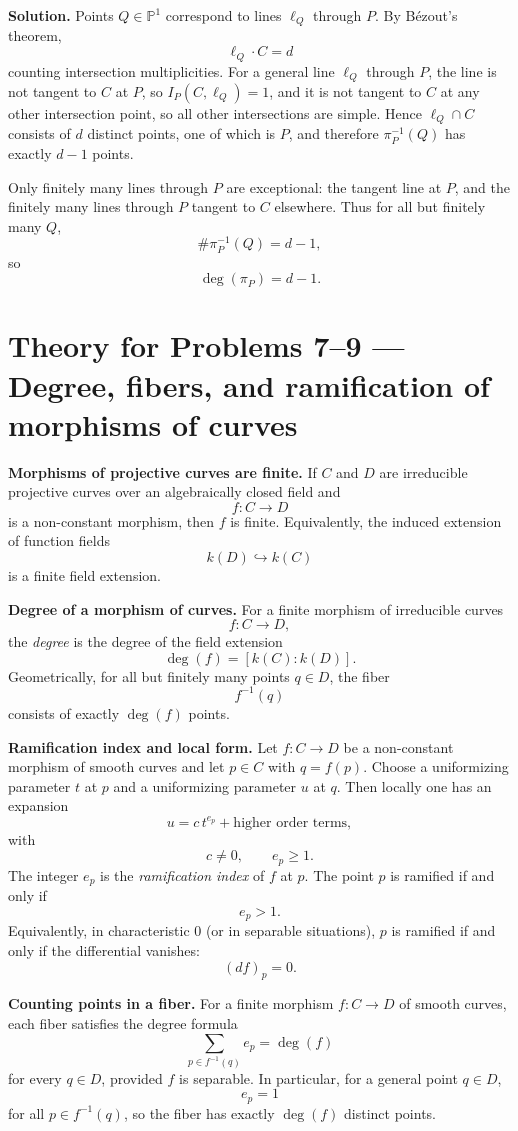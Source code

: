 \documentclass[12pt,a4paper]{article}
\theoremstyle{plain}
\theoremstyle{definition}      %
\begin{document}
\textbf{Solution.}
Points \(Q\in\mathbb P^1\) correspond to lines \(\ell_Q\) through \(P\).
By Bézout's theorem,
\[
\ell_Q\cdot C=d
\]
counting intersection multiplicities.
For a general line \(\ell_Q\) through \(P\), the line is not tangent to \(C\) at \(P\), so \(I_P(C,\ell_Q)=1\), and it is not tangent to \(C\) at any other intersection point, so all other intersections are simple.
Hence \(\ell_Q\cap C\) consists of \(d\) distinct points, one of which is \(P\), and therefore \(\pi_P^{-1}(Q)\) has exactly \(d-1\) points.

Only finitely many lines through \(P\) are exceptional: the tangent line at \(P\), and the finitely many lines through \(P\) tangent to \(C\) elsewhere.
Thus for all but finitely many \(Q\),
\[
\#\pi_P^{-1}(Q)=d-1,
\]
so
\[
\deg(\pi_P)=d-1.
\]


\section*{Theory for Problems 7--9 — Degree, fibers, and ramification of morphisms of curves}

\textbf{Morphisms of projective curves are finite.}
If \(C\) and \(D\) are irreducible projective curves over an algebraically closed field and
\[
f:C\to D
\]
is a non-constant morphism, then \(f\) is finite.
Equivalently, the induced extension of function fields
\[
k(D)\hookrightarrow k(C)
\]
is a finite field extension.

\textbf{Degree of a morphism of curves.}
For a finite morphism of irreducible curves
\[
f:C\to D,
\]
the \emph{degree} is the degree of the field extension
\[
\deg(f)=[k(C):k(D)].
\]
Geometrically, for all but finitely many points \(q\in D\), the fiber
\[
f^{-1}(q)
\]
consists of exactly \(\deg(f)\) points.

\textbf{Ramification index and local form.}
Let \(f:C\to D\) be a non-constant morphism of smooth curves and let \(p\in C\) with \(q=f(p)\).
Choose a uniformizing parameter \(t\) at \(p\) and a uniformizing parameter \(u\) at \(q\).
Then locally one has an expansion
\[
u = c\, t^{e_p} + \text{higher order terms},
\]
with
\[
c\neq 0,
\qquad
e_p\ge 1.
\]
The integer \(e_p\) is the \emph{ramification index} of \(f\) at \(p\).
The point \(p\) is ramified if and only if
\[
e_p>1.
\]
Equivalently, in characteristic \(0\) (or in separable situations), \(p\) is ramified if and only if the differential vanishes:
\[
(df)_p=0.
\]

\textbf{Counting points in a fiber.}
For a finite morphism \(f:C\to D\) of smooth curves, each fiber satisfies the degree formula
\[
\sum_{p\in f^{-1}(q)} e_p = \deg(f)
\]
for every \(q\in D\), provided \(f\) is separable.
In particular, for a general point \(q\in D\),
\[
e_p=1
\]
for all \(p\in f^{-1}(q)\), so the fiber has exactly \(\deg(f)\) distinct points.
\end{document}
